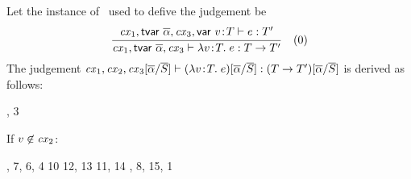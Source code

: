 \begin{bycase}
\Case{\Reabs}\\
Let the instance of \Reabs\ used to defive the judgement be
\[
\frac{\begin{array}{c}\mathit{cx}_1,\mathsf{tvar}\ \overline{\alpha},\mathit{cx}_3,\mathsf{var}\ v\!:\!T\vdash e:T'\end{array}}{\mathit{cx}_1,\mathsf{tvar}\ \overline{\alpha},\mathit{cx}_3\vdash\lambda v\!:\!T.\;e:T\to T'}\quad\mbox{(0)}
\]
The judgement
$\mathit{cx}_1,\mathit{cx}_2,\mathit{cx}_3[\overline{\alpha}/\overline{S}]\vdash(\lambda v\!:\!T.\;e)[\overline{\alpha}/\overline{S}]:(T\to T')[\overline{\alpha}/\overline{S}]$
is derived as follows:
\begin{derivation}
     {\indhyp, 3}
\end{derivation}
If $v\not\in\mathit{cx}_2$:
\begin{derivatioN}{5}
     {\Rcxvdec, 7, 6, 4}
     {10}
     {}
     {12, 13}
     {11, 14}
     {\indhyp, 8, 15, 1}
\end{derivatioN}
\end{bycase}
